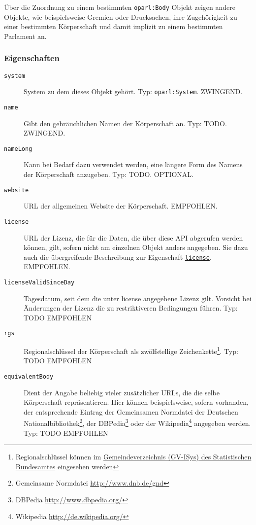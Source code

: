 \documentclass[,a4paper]{article}
\begin{document}
Über die Zuordnung zu einem bestimmten \texttt{oparl:Body} Objekt zeigen
andere Objekte, wie beispielsweise Gremien oder Drucksachen, ihre
Zugehörigkeit zu einer bestimmten Körperschaft und damit implizit zu
einem bestimmten Parlament an.

\subsubsection{Eigenschaften}\label{eigenschaften-1}

\begin{description}
\item[\texttt{system}]
System zu dem dieses Objekt gehört. Typ: \texttt{oparl:System}.
ZWINGEND.
\item[\texttt{name}]
Gibt den gebräuchlichen Namen der Körperschaft an. Typ: TODO. ZWINGEND.
\item[\texttt{nameLong}]
Kann bei Bedarf dazu verwendet werden, eine längere Form des Namens der
Körperschaft anzugeben. Typ: TODO. OPTIONAL.
\item[\texttt{website}]
URL der allgemeinen Website der Körperschaft. EMPFOHLEN.
\item[\texttt{license}]
URL der Lizenz, die für die Daten, die über diese API abgerufen werden
können, gilt, sofern nicht am einzelnen Objekt anders angegeben. Sie
dazu auch die übergreifende Beschreibung zur Eigenschaft
\hyperref[eigenschaftux5flicense]{\texttt{license}}. EMPFOHLEN.
\item[\texttt{licenseValidSinceDay}]
Tagesdatum, seit dem die unter license angegebene Lizenz gilt. Vorsicht
bei Änderungen der Lizenz die zu restriktiveren Bedingungen führen. Typ:
TODO EMPFOHLEN
\item[\texttt{rgs}]
Regionalschlüssel der Körperschaft als zwölfstellige
Zeichenkette\footnote{Regionalschlüssel können im
  \href{https://www.destatis.de/DE/ZahlenFakten/LaenderRegionen/Regionales/Gemeindeverzeichnis/Gemeindeverzeichnis.html}{Gemeindeverzeichnis
  (GV-ISys) des Statistischen Bundesamtes} eingesehen werden}. Typ: TODO
EMPFOHLEN
\item[\texttt{equivalentBody}]
Dient der Angabe beliebig vieler zusätzlicher URLs, die die selbe
Körperschaft repräsentieren. Hier können beispielsweise, sofern
vorhanden, der entsprechende Eintrag der Gemeinsamen Normdatei der
Deutschen Nationalbibliothek\footnote{Gemeinsame Normdatei
  \url{http://www.dnb.de/gnd}}, der DBPedia\footnote{DBPedia
  \url{http://www.dbpedia.org/}} oder der Wikipedia\footnote{Wikipedia
  \url{http://de.wikipedia.org/}} angegeben werden. Typ: TODO EMPFOHLEN

\end{description}
\end{document}

